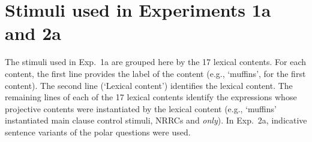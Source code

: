 \documentclass[11pt,fleqn]{article}
\newcommand{\6}{\mbox{$[\hspace*{-.6mm}[$}}
\newcommand{\9}{\mbox{$]\hspace*{-.6mm}]$}}
\begin{document}
\section{Stimuli used in Experiments 1a and 2a}\label{a-exp1a-2a-stimuli}

The stimuli used in Exp.~1a are grouped here by the 17 lexical contents. For each content, the first line provides the label of the content (e.g., `muffins', for the first content). The second line (`Lexical content') identifies the lexical content. The remaining lines of each of the 17 lexical contents identify the expressions whose projective contents were instantiated by the lexical content (e.g., `muffins' instantiated main clause control stimuli, NRRCs and {\em only}). In Exp.~2a, indicative sentence variants of the polar questions were used.
\end{document}
